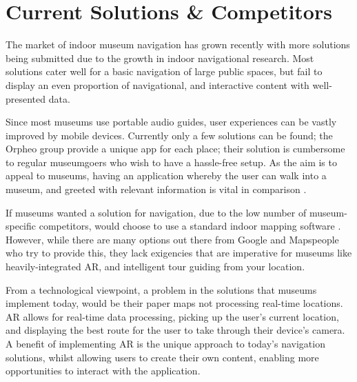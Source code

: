 
{
\section{Current Solutions \& Competitors}
The market of indoor museum navigation has grown recently with more solutions being submitted due to the growth in indoor navigational research. Most solutions cater well for a basic navigation of large public spaces, but fail to display an even proportion of navigational, and interactive content with well-presented data.

Since most museums use portable audio guides, user experiences can be vastly improved by mobile devices. Currently only a few solutions can be found; the Orpheo group \cite{orpheo} provide a unique app for each place; their solution is cumbersome to regular museumgoers who wish to have a hassle-free setup. As the aim is to appeal to museums, having an application whereby the user can walk into a museum, and greeted with relevant information is vital in comparison \cite{microsoft}.

If museums wanted a solution for navigation, due to the low number of museum-specific competitors, would choose to use a standard indoor mapping software \cite{engadget}. However, while there are many options out there from Google and Mapspeople \cite{mapspeople} who try to provide this, they lack exigencies that are imperative for museums like heavily-integrated AR, and intelligent tour guiding from your location.

From a technological viewpoint, a problem in the solutions that museums implement today, would be their paper maps not processing real-time locations. AR allows for real-time data processing, picking up the user's current location, and displaying the best route for the user to take through their device's camera. A benefit of implementing AR is the unique approach to today's navigation solutions, whilst allowing users to create their own content, enabling more opportunities to interact with the application.

}